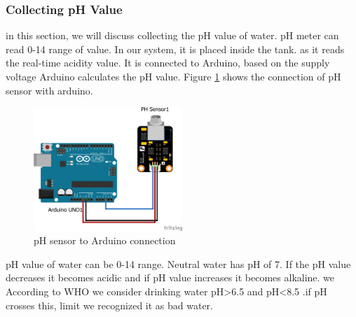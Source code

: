 \subsubsection*{Collecting pH Value}
in this section, we will discuss collecting the pH value of water.
pH meter can read 0-14 range of value. In our system, it is placed inside the tank. as it reads the real-time acidity value. It is connected to Arduino, based on the supply voltage Arduino calculates the pH value. Figure \ref{pHandBB} shows the connection of pH sensor with arduino.
\begin{figure}[H]
\centering
\includegraphics[width=0.5\textwidth]{figures/PH_bb.png}
\caption{pH sensor to Arduino connection}
\label{pHandBB}
\end{figure}
pH value of water can be 0-14 range. Neutral water has pH of 7. If the pH value decreases it becomes acidic and if pH value increases it becomes alkaline. we According to WHO we consider drinking water pH>6.5 and pH<8.5 .if pH crosses this, limit we recognized it as bad water. 
